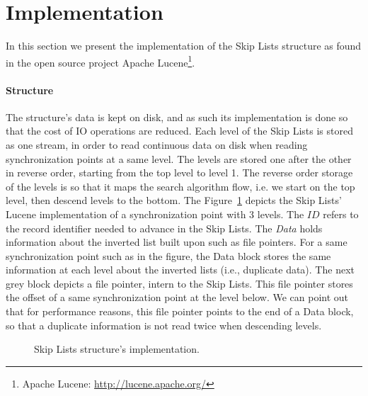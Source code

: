\section{Implementation}
 
 In this section we present the implementation of the Skip Lists structure as
 found in the open source project Apache Lucene\footnote{Apache Lucene:
 \url{http://lucene.apache.org/}}.
 
\paragraph{Structure}

The structure's data is kept on disk, and as such its implementation is done so
that the cost of IO operations are reduced. Each level of the Skip Lists is
stored as one stream, in order to read continuous data on disk when reading
synchronization points at a same level. The levels are stored one after the
other in reverse order, starting from the top level to level 1. The reverse
order storage of the levels is so that it maps the search algorithm flow, i.e.
we start on the top level, then descend levels to the bottom. The
Figure~\ref{fig:skiplists-impl} depicts the Skip Lists' Lucene implementation
of a synchronization point with 3 levels. The $ID$ refers to the record
identifier needed to advance in the Skip Lists. The \emph{Data} holds
information about the inverted list built upon such as file pointers. For a
same synchronization point such as in the figure, the Data block stores the same
information at each level about the inverted lists (i.e., duplicate data). The
next grey block depicts a file pointer, intern to the Skip Lists. This file
pointer stores the offset of a same synchronization point at the level below.
We can point out that for performance reasons, this file pointer points to the
end of a Data block, so that a duplicate information is not read twice when
descending levels.
 
\begin{figure}
\centering
{}%
\caption{Skip Lists structure's implementation.}
\label{fig:skiplists-impl}
\end{figure}

